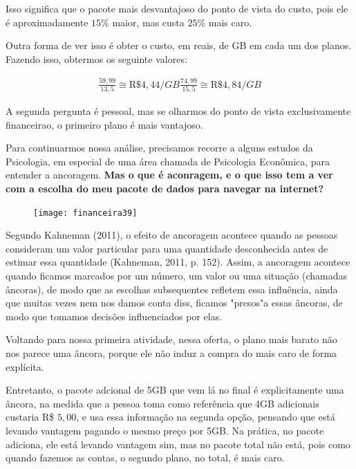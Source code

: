 Isso significa que o pacote mais desvantajoso do ponto de vista do custo, pois ele é aproximadamente $15$\% maior, mas custa $25\%$ mais caro.

Outra forma de ver isso é obter o custo, em reais, de GB em cada um dos planos. Fazendo isso, obtermos os seguinte valores:

\begin{align*}
\frac{59{,}99}{13{,}5}\cong\text{R\$}4{,}44/GB
\frac{74{,}99}{15{,}5}\cong\text{R\$}4{,}84/GB
\end{align*}

A segunda pergunta é pessoal, mas se olharmos do ponto de vista exclusivamente financeirao, o primeiro plano é mais vantajoso.

Para continuarmos nossa análise, precisamos recorre a alguns estudos da Psicologia, em especial de uma área chamada de Psicologia Econômica, para entender a ancoragem. \textbf{Mas o que é aconragem, e o que isso tem a ver com a escolha do meu pacote de dados para navegar na internet?}

\setlength{\columnsep}{18pt}
\begin{figure}
\vspace{-1em}
\texttt{[image: financeira39]}

\end{figure}

Segundo Kahneman (2011), o efeito de ancoragem acontece quando as pessoas consideram um valor particular para uma quantidade desconhecida antes de estimar essa quantidade (Kahneman, 2011, p. 152). Assim, a ancoragem acontece quando ficamos marcados por um número, um valor ou uma situação (chamadas âncoras), de modo que as escolhas subsequentes refletem essa influência, ainda que muitas vezes nem nos damos conta diss, ficamos "presos"a essas âncoras, de modo que tomamos decisões influenciados por elas.

Voltando para nossa primeira atividade, nessa oferta, o plano mais barato não nos parece uma âncora, porque ele não induz a compra do mais caro de forma explícita. 

Entretanto, o pacote adcional de 5GB que vem lá no final é explicitamente uma âncora, na medida que a pessoa toma como referência que 4GB adicionais custaria R\$ $5{,}00$, e usa essa informação na segunda opção, pensando que está levando vantagem pagando o mesmo preço por 5GB. Na prática, no pacote adiciona, ele está levando vantagem sim, mas no pacote total não está, pois como quando fazemos as contas, o segundo plano, no total, é mais caro.

